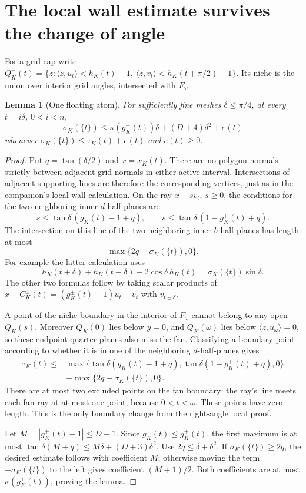 \documentclass[11pt]{article}
\newtheorem{lemma}[theorem]{Lemma}
\newcommand{\ip}[2]{\langle #1,#2\rangle}
\begin{document}
\section{The local wall estimate survives the change of angle}
For a grid cap write $Q^-_K(t)=\{z:\ip z{u_t}<h_K(t)-1,\ \ip z{v_t}<h_K(t+\pi/2)-1\}$. Its niche is the union over interior grid angles, intersected with $F_\omega$.

\begin{lemma}[One floating atom]\label{lem:atom}
For sufficiently fine meshes $\delta\le\pi/4$, at every $t=i\delta$, $0<i<n$,
\[
 \sigma_K(\{t\})\le\kappa(g_K^+(t))\delta+(D+4)\delta^2+e(t)
\]
whenever $\sigma_K(\{t\})\le\tau_K(t)+e(t)$ and $e(t)\ge0$.
\end{lemma}
\begin{proof}
Put $q=\tan(\delta/2)$ and $x=x_K(t)$. There are no polygon normals strictly between adjacent grid normals in either active interval. Intersections of adjacent supporting lines are therefore the corresponding vertices, just as in the companion's local wall calculation. On the ray $x-sv_t$, $s\ge0$, the conditions for the two neighboring inner $d$-half-planes are
\[
 s\le\tan\delta\,(g_K^-(t)-1+q),\qquad
 s\le\tan\delta\,(1-g_K^+(t)+q).
\]
The intersection on this line of the two neighboring inner $b$-half-planes has length at most
\[
 \max\{2q-\sigma_K(\{t\}),0\}.
\]
For example the latter calculation uses
\[
 h_K(t+\delta)+h_K(t-\delta)-2\cos\delta\,h_K(t)
 =\sigma_K(\{t\})\sin\delta.
\]
The other two formulas follow by taking scalar products of $x-C_K^\pm(t)=(g_K^\pm(t)-1)u_t-v_t$ with $v_{t\pm\delta}$.

A point of the niche boundary in the interior of $F_\omega$ cannot belong to any open $Q^-_K(s)$. Moreover $Q^-_K(0)$ lies below $y=0$, and $Q^-_K(\omega)$ lies below $\ip z{u_\omega}=0$, so these endpoint quarter-planes also miss the fan. Classifying a boundary point according to whether it is in one of the neighboring $d$-half-planes gives
\begin{align*}
 \tau_K(t)\le{}&\max\{\tan\delta(g_K^-(t)-1+q),\tan\delta(1-g_K^+(t)+q),0\}\\
 &+\max\{2q-\sigma_K(\{t\}),0\}.
\end{align*}
There are at most two excluded points on the fan boundary: the ray's line meets each fan ray at at most one point, because $0<t<\omega$. These points have zero length. This is the only boundary change from the right-angle local proof.

Let $M=|g_K^+(t)-1|\le D+1$. Since $g_K^-(t)\le g_K^+(t)$, the first maximum is at most
$\tan\delta(M+q)\le M\delta+(D+3)\delta^2$. Use $2q\le\delta+\delta^2$. If $\sigma_K(\{t\})\ge2q$, the desired estimate follows with coefficient $M$; otherwise moving the term $-\sigma_K(\{t\})$ to the left gives coefficient $(M+1)/2$. Both coefficients are at most $\kappa(g_K^+(t))$, proving the lemma.
\end{proof}
\end{document}
